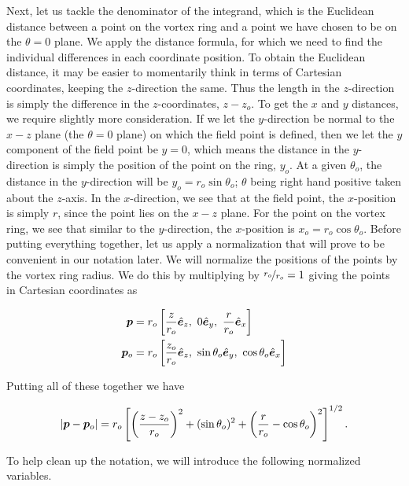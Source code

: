 Next, let us tackle the denominator of the integrand, which is the Euclidean distance between a point on the vortex ring and a point we have chosen to be on the \(\theta=0\) plane.
%
We apply the distance formula, for which we need to find the individual differences in each coordinate position.
%
To obtain the Euclidean distance, it may be easier to momentarily think in terms of Cartesian coordinates, keeping the \(z\)-direction the same.
%
Thus the length in the \(z\)-direction is simply the difference in the \(z\)-coordinates, \(z-z_o\).
%
To get the \(x\) and \(y\) distances, we require slightly more consideration.
%
If we let the \(y\)-direction be normal to the \(x-z\) plane (the \(\theta = 0\) plane) on which the field point is defined,
then we let the \(y\) component of the field point be \(y = 0\),
which means the distance in the \(y\)-direction is simply the position of the point on the ring, \(y_o\).
%
At a given \(\theta_o\), the distance in the \(y\)-direction will be \(y_o = r_o \sin\theta_o\); \(\theta\) being right hand positive taken about the \(z\)-axis.
%
In the \(x\)-direction, we see that at the field point, the \(x\)-position is simply \(r\), since the point lies on the \(x-z\) plane.
%
For the point on the vortex ring, we see that similar to the \(y\)-direction, the \(x\)-position is \(x_o = r_o \cos\theta_o\).
%
Before putting everything together, let us apply a normalization that will prove to be convenient in our notation later.
%
We will normalize the positions of the points by the vortex ring radius.
%
We do this by multiplying by \(\nicefrac{r_o}{r_o}=1\) giving the points in Cartesian coordinates as

\begin{align}
    \bm{p} &= r_o\left[\frac{z}{r_o} \hat{\bm{e}}_z,~ 0 \hat{\bm{e}}_y,~ \frac{r}{r_o}\hat{\bm{e}}_x\right] \\
    \bm{p}_o &= r_o\left[\frac{z_o}{r_o} \hat{\bm{e}}_z,~ \sin\theta_o \hat{\bm{e}}_y,~ \cos\theta_o\hat{\bm{e}}_x\right]
\end{align}

Putting all of these together we have

\begin{equation}
    \label{eqn:euclideandistance1}
    |\bm{p}-\bm{p}_o| = r_o \left[\left(\frac{z-z_o}{r_o}\right)^2 + (\sin\theta_o)^2 + \left(\frac{r}{r_o}-\cos\theta_o\right)^2 \right]^{1/2}.
\end{equation}

To help clean up the notation, we will introduce the following normalized variables.

